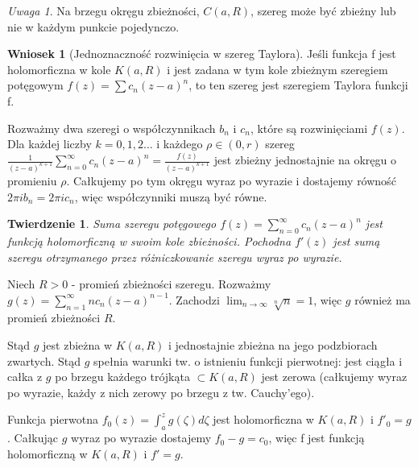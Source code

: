 \documentclass[11pt]{article}
\theoremstyle{plain}
\newtheorem*{theorem}{Twierdzenie}
\theoremstyle{definition}
\newtheorem*{corollary}{Wniosek}
\theoremstyle{remark}
\newtheorem*{remark}{Uwaga}
\let\oldendproof\endproof
\renewenvironment{proof}[1][\proofname]{
  \oldproof[\textsc{\small #1}]
}{\oldendproof}
\begin{document}
\begin{remark}
  Na brzegu okręgu zbieżności, $ C(a, R) $, szereg może być zbieżny lub nie w każdym punkcie pojedynczo.
\end{remark}

\begin{corollary}[Jednoznaczność rozwinięcia w szereg Taylora]
  Jeśli funkcja f jest holomorficzna w kole $ K(a, R) $ i jest zadana w tym kole zbieżnym szeregiem potęgowym $ f(z) = \sum c_n(z-a)^n $, to ten szereg jest szeregiem Taylora funkcji f.
\end{corollary}

\begin{proof}
  Rozważmy dwa szeregi o współczynnikach $ b_n $ i $ c_n $, które są rozwinięciami $ f(z) $.
  Dla każdej liczby $ k = 0, 1, 2\dots $ i każdego $ \rho \in (0, r) $ szereg $ \frac{1}{(z-a)^{k+1}} \sum_{n=0}^{\infty} c_{n}(z-a)^n = \frac{f(z)}{(z-a)^{k+1}} $ jest zbieżny jednostajnie na okręgu o promieniu $ \rho $.
  Całkujemy po tym okręgu wyraz po wyrazie i dostajemy równość $ 2 \pi i b_n = 2 \pi i c_n $, więc współczynniki muszą być równe.
\end{proof}

\begin{theorem}
  Suma szeregu potęgowego $ f(z) = \sum_{n=0}^{\infty} c_{n}(z-a)^{n} $ jest funkcją holomorficzną w swoim kole zbieżności.
  Pochodna $ f'(z) $ jest sumą szeregu otrzymanego przez różniczkowanie szeregu wyraz po wyrazie.
\end{theorem}

\begin{proof}
  Niech $ R>0 $ - promień zbieżności szeregu. Rozważmy $ g(z) = \sum_{n=1}^{\infty} nc_{n}(z-a)^{n-1} $.
  Zachodzi $ \lim_{n \to \infty} \sqrt[n]{n} = 1 $, więc $ g $ również ma promień zbieżności $ R $.

  Stąd $ g $ jest zbieżna w $ K(a, R) $ i jednostajnie zbieżna na jego podzbiorach zwartych.
  Stąd $ g $ spełnia warunki tw. o istnieniu funkcji pierwotnej:
  jest ciągła
  i całka z $ g $ po brzegu każdego trójkąta $ \subset K(a, R) $ jest zerowa (całkujemy wyraz po wyrazie, każdy z nich zerowy po brzegu z tw. Cauchy'ego).

  Funkcja pierwotna $ f_0(z) = \int_{a}^{z} g(\zeta) d\zeta $ jest holomorficzna w $ K(a, R) $ i $ f'_0 = g $.
  Całkując $ g $ wyraz po wyrazie dostajemy $ f_0 - g = c_0 $, więc f jest funkcją holomorficzną w $ K(a, R) $ i $ f' = g $.
\end{proof}
\end{document}

